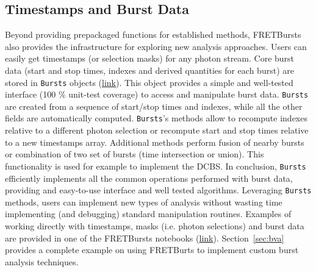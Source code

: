 \subsection{Timestamps and Burst Data}
\label{sec:burststimes}

Beyond providing prepackaged functions for established methods, 
FRETBursts also provides the infrastructure for exploring new analysis approaches.
Users can easily get timestamps (or selection masks) for any photon stream.
Core burst data (start and stop times, indexes 
and derived quantities for each burst) are stored in \verb|Bursts| objects
(\href{http://fretbursts.readthedocs.org/en/latest/burstsearch.html}{link}).
This object provides a simple and well-tested interface (100 \% unit-test coverage) 
to access and manipulate burst data. \verb|Bursts| are created from a sequence of start/stop 
times and indexes, while all the other fields are automatically
computed. \verb|Bursts|'s methods allow to recompute indexes relative to a different photon
selection or recompute start and stop times relative to a new timestamps array.
Additional methods perform fusion of nearby bursts or combination of two set of bursts 
(time intersection or union). This functionality is used for example to implement 
the DCBS.
In conclusion, \verb|Bursts| efficiently implements all the common operations performed 
with burst data, providing and easy-to-use interface and well tested algorithms. 
Leveraging \verb|Bursts| methods, users can implement new types of analysis without 
wasting time implementing (and debugging) standard manipulation routines.
Examples of working directly with timestamps, masks (i.e. photon selections) and 
burst data are provided in one of the FRETBursts notebooks (\href{http://nbviewer.jupyter.org/github/tritemio/FRETBursts_notebooks/blob/master/notebooks/Example%20-%20Working%20with%20timestamps%20and%20bursts.ipynb}{link}). 
Section~\ref{sec:bva} provides a complete example on using FRETBurts to implement 
custom burst analysis techniques.

